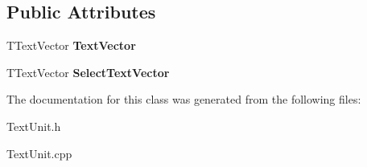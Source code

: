 \subsection*{Public Attributes}
\begin{DoxyCompactItemize}
\item 
\mbox{\label{class_t_text_handler_a059b11907e0db9c7a847682a455b9cb9}} 
T\+Text\+Vector {\bfseries Text\+Vector}
\item 
\mbox{\label{class_t_text_handler_a5191f5daba7e3f1ea8f0ae82d8067211}} 
T\+Text\+Vector {\bfseries Select\+Text\+Vector}
\end{DoxyCompactItemize}


The documentation for this class was generated from the following files\+:\begin{DoxyCompactItemize}
\item 
Text\+Unit.\+h\item 
Text\+Unit.\+cpp\end{DoxyCompactItemize}
